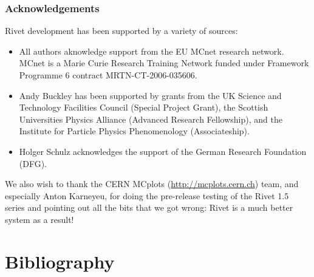 \documentclass{JHEP3}
\begin{document}
\section{Acknowledgements}
\label{app:acknowledgements}

Rivet development has been supported by a variety of sources:

\begin{itemize}
\item All authors aknowledge support from the EU MCnet research network. MCnet
  is a Marie Curie Research Training Network funded under Framework Programme 6
  contract MRTN-CT-2006-035606.
\item Andy Buckley has been supported by grants from the UK Science and
  Technology Facilities Council (Special Project Grant), the Scottish
  Universities Physics Alliance (Advanced Research Fellowship), and the
  Institute for Particle Physics Phenomenology (Associateship).
\item Holger Schulz acknowledges the support of the German Research Foundation (DFG).
\end{itemize}

We also wish to thank the CERN MCplots (\url{http://mcplots.cern.ch}) team, and
especially Anton Karneyeu, for doing the pre-release testing of the Rivet 1.5
series and pointing out all the bits that we got wrong: Rivet is a much better
system as a result!


\cleardoublepage
\part{Bibliography}

{\raggedright
  
}
\end{document}
